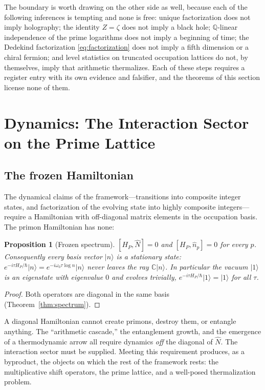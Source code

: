 \documentclass[11pt,a4paper]{article}
\theoremstyle{plain}
\newtheorem{proposition}[theorem]{Proposition}
\theoremstyle{definition}
\theoremstyle{remark}
\newcommand{\ket}[1]{\lvert #1\rangle}
\newcommand{\Qq}{\mathbb{Q}}
\newcommand{\Cc}{\mathbb{C}}
\newcommand{\Nhat}{\widehat{N}}
\begin{document}
The boundary is worth drawing on the other side as well, because each of the following
inferences is tempting and none is free: unique factorization does not imply holography;
the identity $Z=\zeta$ does not imply a black hole; $\Qq$-linear independence of the prime
logarithms does not imply a beginning of time; the Dedekind factorization
\eqref{eq:factorization} does not imply a fifth dimension or a chiral fermion; and level
statistics on truncated occupation lattices do not, by themselves, imply that arithmetic
thermalizes. Each of these steps requires a register entry with its own evidence and
falsifier, and the theorems of this section license none of them.

\section{Dynamics: The Interaction Sector on the Prime Lattice}\label{sec:dynamics}

\subsection{The frozen Hamiltonian}

The dynamical claims of the framework---transitions into composite integer states, and
factorization of the evolving state into highly composite integers---require a Hamiltonian
with off-diagonal matrix elements in the occupation basis. The primon Hamiltonian has none:

\begin{proposition}[Frozen spectrum]\label{prop:frozen}
$[H_{P},\Nhat]=0$ and $[H_{P},\hat n_{p}]=0$ for every $p$. Consequently every basis vector
$\ket{n}$ is a stationary state: $e^{-i\tau H_{P}/\hbar}\ket{n}=e^{-i\omega_{0}\tau\log
n}\ket{n}$ never leaves the ray $\Cc\ket{n}$. In particular the vacuum $\ket{1}$ is an
eigenstate with eigenvalue $0$ and evolves trivially, $e^{-i\tau H_{P}/\hbar}\ket{1}=\ket{1}$
for all $\tau$.
\end{proposition}

\begin{proof}
Both operators are diagonal in the same basis (Theorem~\ref{thm:spectrum}).
\end{proof}

A diagonal Hamiltonian cannot create primons, destroy them, or entangle anything. The
``arithmetic cascade,'' the entanglement growth, and the emergence of a thermodynamic arrow
all require dynamics \emph{off} the diagonal of $\Nhat$. The interaction sector must be
supplied. Meeting this requirement produces, as a byproduct, the objects on which the rest
of the framework rests: the multiplicative shift operators, the prime lattice, and a
well-posed thermalization problem.
\end{document}

